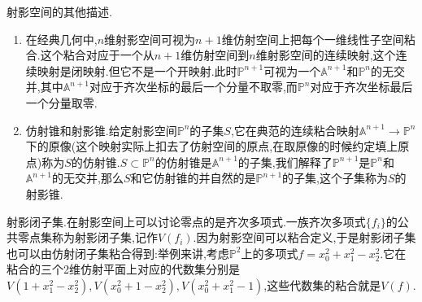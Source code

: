 射影空间的其他描述.
\begin{enumerate}
	\item 在经典几何中,$n$维射影空间可视为$n+1$维仿射空间上把每个一维线性子空间粘合.这个粘合对应于一个从$n+1$维仿射空间到$n$维射影空间的连续映射,这个连续映射是闭映射.但它不是一个开映射.此时$\mathbb{P}^{n+1}$可视为一个$\mathbb{A}^{n+1}$和$\mathbb{P}^n$的无交并,其中$\mathbb{A}^{n+1}$对应于齐次坐标的最后一个分量不取零,而$\mathbb{P}^n$对应于齐次坐标最后一个分量取零.
	\item 仿射锥和射影锥.给定射影空间$\mathbb{P}^n$的子集$S$,它在典范的连续粘合映射$\mathbb{A}^{n+1}\to\mathbb{P}^n$下的原像(这个映射实际上扣去了仿射空间的原点,在取原像的时候约定填上原点)称为$S$的仿射锥.$S\subset\mathbb{P}^n$的仿射锥是$\mathbb{A}^{n+1}$的子集,我们解释了$\mathbb{P}^{n+1}$是$\mathbb{P}^n$和$\mathbb{A}^{n+1}$的无交并,那么$S$和它仿射锥的并自然的是$\mathbb{P}^{n+1}$的子集,这个子集称为$S$的射影锥.
\end{enumerate}

射影闭子集.在射影空间上可以讨论零点的是齐次多项式.一族齐次多项式$\{f_i\}$的公共零点集称为射影闭子集,记作$V(f_i)$.因为射影空间可以粘合定义,于是射影闭子集也可以由仿射闭子集粘合得到:举例来讲,考虑$\mathbb{P}^2$上的多项式$f=x_0^2+x_1^2-x_2^2$.它在粘合的三个2维仿射平面上对应的代数集分别是$V(1+x_1^2-x_2^2),V(x_0^2+1-x_2^2),V(x_0^2+x_1^2-1)$,这些代数集的粘合就是$V(f)$.

